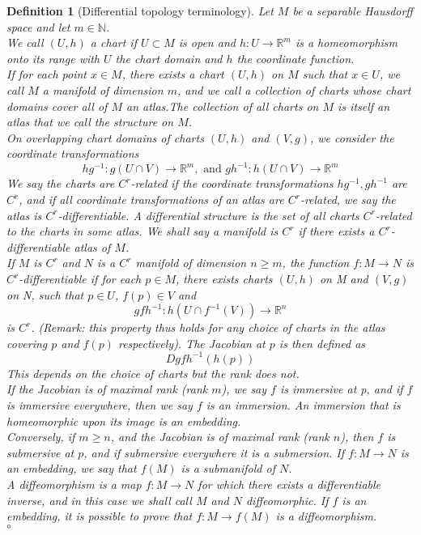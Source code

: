 \documentclass[11pt, a4paper]{memoir}
\theoremstyle{break}
\theoremstyle{break}
\newtheorem{innerdefn}{Definition}
\newenvironment{defn}
  {\begin{innerdefn}}
  {\ensuremath{\circ}\end{innerdefn}}
\theoremstyle{nonumberplain}
\newcommand{\mN}{\mathbb{N}}
\newcommand{\mR}{\mathbb{R}}
\begin{document}
\begin{defn}[Differential topology terminology]
Let $M$ be a separable Hausdorff space and let $m\in \mN$.\\[5pt]
We call $(U,h)$ a \emph{chart} if $U\subset M$ is open and $h: U\to \mR^m$ is a homeomorphism onto its range with $U$ the \emph{chart domain} and $h$ the \emph{coordinate function}.\\[5pt]
If for each point $x\in M$, there exists a chart $(U,h)$ on $M$ such that $x\in U$, we call $M$ a \emph{manifold of dimension $m$}, and we call a collection of charts whose chart domains cover all of $M$ an \emph{atlas}.The collection of all charts on $M$ is itself an atlas that we call the \emph{structure} on $M$.\\[5pt]
On overlapping chart domains of charts $(U,h)$ and $(V,g)$, we consider the \emph{coordinate transformations}
$$hg^{-1}: g(U\cap V)\to \mR^m, \text{ and } gh^{-1}: h(U\cap V)\to \mR^m$$
We say the charts are \emph{$C^r$-related} if the coordinate transformations $hg^{-1}, gh^{-1}$ are $C^r$, and if all coordinate transformations of an atlas are $C^r$-related, we say the atlas is \emph{$C^r$-differentiable}. A \emph{differential structure} is the set of all charts $C^r$-related to the charts in some atlas. We shall say a manifold is $C^r$ if there exists a $C^r$-differentiable atlas of $M$.\\[5pt]
If $M$ is $C^r$ and $N$ is a $C^r$ manifold of dimension $n\geqslant m$, the function $f: M\to N$ is \emph{$C^r$-differentiable} if for each $p\in M$, there exists charts $(U,h)$ on M and $(V,g)$ on N, such that $p\in U$, $f(p)\in V$ and 
$$gfh^{-1}: h(U\cap f^{-1}(V))\to \mR^n$$
is $C^r$. (Remark: this property thus holds for any choice of charts in the atlas covering $p$ and $f(p)$ respectively). The \emph{Jacobian} at $p$ is then defined as 
$$Dgfh^{-1}(h(p))$$
This depends on the choice of charts but the rank does not.\\[5pt]
If the Jacobian is of maximal rank (rank $m$), we say $f$ is \emph{immersive at p}, and if $f$ is immersive everywhere, then we say $f$ is an \emph{immersion}. An immersion that is homeomorphic upon its image is an \emph{embedding}.\\[5pt]
Conversely, if $m\geqslant n$, and the Jacobian is of maximal rank (rank $n$), then $f$ is \emph{submersive at $p$}, and if submersive everywhere it is a \emph{submersion}. If $f: M\to N$ is an embedding, we say that $f(M)$ is a \emph{submanifold} of $N$.\\[5pt]
A \emph{diffeomorphism} is a map $f:M\to N$ for which there exists a differentiable inverse, and in this case we shall call $M$ and $N$ \emph{diffeomorphic}. If $f$ is an embedding, it is possible to prove that $f:M\to f(M)$ is a diffeomorphism.\\[5pt]

\end{defn}
\end{document}
